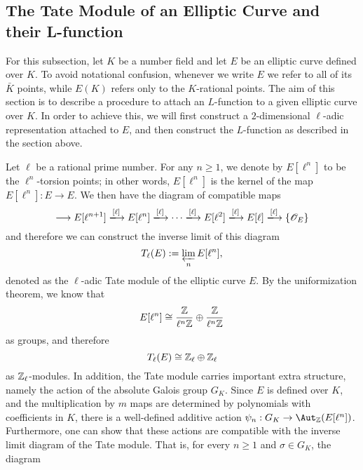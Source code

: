 
\subsection{The Tate Module of an Elliptic Curve and their L-function}
For this subsection, let $K$ be a number field and let $E$ be an elliptic curve defined over $K$. To avoid notational confusion, whenever we write $E$ we refer to all of its $\bar{K}$ points, while $E(K)$ refers only to the $K$-rational points. The aim of this section is to describe a procedure to attach an $L$-function to a given elliptic curve over $K$. In order to achieve this, we will first construct a $2$-dimensional $\ell$-adic representation attached to $E$, and then construct the $L$-function as described in the section above.

Let $\ell$ be a rational prime number. For any $n\geq1$, we denote by $E[\ell^n]$ to be the $\ell^n$-torsion points; in other words, $E[\ell^n]$ is the kernel of the map $E[\ell^n]:E\to E$. We then have the diagram of compatible maps
\[
    \longrightarrow E[\ell^{n+1}]\xlongrightarrow{[\ell]} E[\ell^{n}]\xlongrightarrow{[\ell]}\cdots\xlongrightarrow{[\ell]} E[\ell^2]\xlongrightarrow{[\ell]} E[\ell]\xlongrightarrow{[\ell]} \{\mathcal{O}_E\} 
\] 
and therefore we can construct the inverse limit of this diagram
$$T_\ell(E):=\varprojlim_{n}E[\ell^n],$$
denoted as the $\ell$-adic Tate module of the elliptic curve $E$. By the uniformization theorem, we know that 
$$E[\ell^n]\cong\frac{\mathbb{Z}}{\ell^n\mathbb{Z}}\oplus\frac{\mathbb{Z}}{\ell^n\mathbb{Z}}$$
as groups, and therefore 
$$T_\ell(E)\cong\mathbb{Z}_\ell\oplus\mathbb{Z}_\ell$$
as $\mathbb{Z}_\ell$-modules. In addition, the Tate module carries important extra structure, namely the action of the absolute Galois group $G_K$. Since $E$ is defined over $K$, and the multiplication by $m$ maps are determined by polynomials with coefficients in $K$, there is a well-defined additive action $\psi_n:G_K\rightarrow\Aut_{\ZZ}(E[\ell^n])$. Furthermore, one can show that these actions are compatible with the inverse limit diagram of the Tate module. That is, for every $n\geq 1$ and $\sigma\in G_K$, the diagram


\begin{center}
\end{center}

